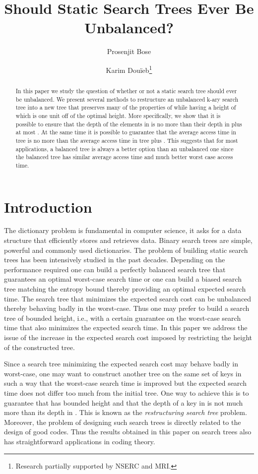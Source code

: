 \documentclass{llncs}\usepackage[english]{babel}
\title{Should Static Search Trees  Ever Be Unbalanced?}
\author{ Prosenjit Bose \and Karim Dou\"ieb\thanks{Research partially supported by NSERC and MRI.}}
\institute{ School of Computer Science, Carleton University, Herzberg Building \\
1125 Colonel By Drive, Ottawa, Ontario, K1S 5B6 Canada \\
\email{\{jit,karim\}@cg.scs.carleton.ca }\\
http://cg.scs.carleton.ca 
}
\date{}
\begin{document}
\sloppy
\maketitle

\begin{abstract}
In this paper we study the question of whether or not a static search tree should ever be unbalanced. We present several methods to restructure an unbalanced k-ary search tree  into a new tree  that preserves many of the properties of  while having a height of  which is one unit off of the optimal height. More specifically, we show that it is possible to ensure that the depth of the elements in  is no more than their depth in  plus at most . At the same time it is possible to guarantee that the average access time  in tree  is no more than the average access time  in tree  plus . This suggests that for most applications, a balanced tree is always a better option than an unbalanced one since the balanced tree has similar average access time and much better worst case access time.
\end{abstract}

\section{Introduction}
The dictionary problem is fundamental in computer science, it asks for a data structure that efficiently stores and retrieves data. Binary search trees are simple, powerful and commonly used dictionaries.
The problem of building static search trees has been intensively studied in the past decades. Depending on the performance required one can build a perfectly balanced search tree that guarantees an optimal worst-case search time or one can build a biased search tree matching the entropy bound thereby providing an optimal expected search time. The search tree that minimizes the expected search cost can be unbalanced thereby behaving badly in the worst-case. Thus one may prefer to build a search tree of bounded height, i.e., with a certain guarantee on the worst-case search time that also minimizes the expected search time. In this paper we address the issue of the increase in the expected search cost imposed by restricting the height of the constructed tree. 

Since a search tree  minimizing the expected search cost may behave badly in worst-case, one may want to construct another tree  on the same set of keys in such a way that the worst-case search time is improved but the expected search time does not differ too much from the initial tree. One way to achieve this is to guarantee that  has bounded height and that the depth of a key in  is not much more than its depth in . This is known as the \emph{restructuring search tree} problem.  Moreover, the problem of designing such search trees is directly related to the design of good codes. Thus the results obtained in this paper on search trees also has straightforward applications in coding theory.
\end{document}

